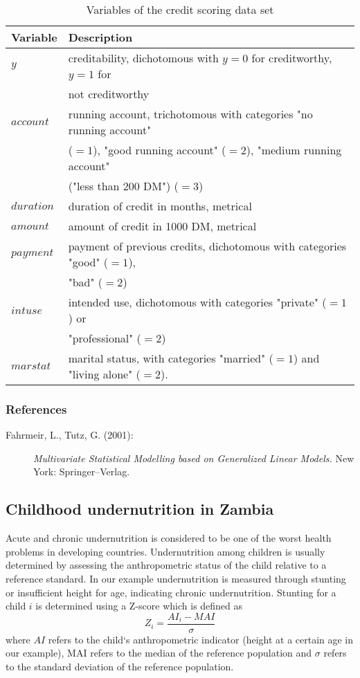 \begin{table}[ht]

\begin{tabular}{|l|l|}
\hline
{\bf Variable} & {\bf Description} \\
\hline
$y$ & creditability, dichotomous with $y=0$ for creditworthy, $y=1$ for \\
    & not creditworthy \\
$account$ & running account, trichotomous with categories "no
running account" \\& ($=1$),
    "good running account"
($=2$),  "medium running account" \\&("less than 200 DM") ($=3$)  \\
$duration$ & duration of credit in months, metrical \\
$amount$ & amount of credit in 1000 DM, metrical \\
$payment$ & payment of previous credits, dichotomous with categories "good" ($=1$), \\ & "bad" ($=2$)  \\
$intuse$ & intended use, dichotomous with categories "private" ($=1$) or \\ & "professional" ($=2$)  \\
$marstat$ & marital status, with categories "married" ($=1$) and "living alone" ($=2$). \\
\hline
\end{tabular}
{\em \caption{\label{creditdatavar}Variables of the credit scoring
data set}}
\end{table}

\subsubsection*{References}

\begin{description}
\item [Fahrmeir, L., Tutz, G. (2001):] {\it Multivariate Statistical
Modelling based on Generalized Linear Models.} New York:
Springer--Verlag.
\end{description}

\subsection{Childhood undernutrition in Zambia}
\label{zambia}  

Acute and chronic undernutrition is considered to be one of the
worst health problems in developing countries. Undernutrition
among children is usually determined by assessing the
anthropometric status of the child relative to a reference
standard. In our example undernutrition is measured through
stunting or insufficient height for age, indicating chronic
undernutrition. Stunting for a child $i$ is determined using a
Z-score which is defined as
\[Z_i = \frac{AI_i-MAI}{\sigma}\]
where $AI$ refers to the child`s anthropometric indicator (height
at a certain age in our example), MAI refers to the median of the
reference population and $\sigma$ refers to the standard deviation
of the reference population.

